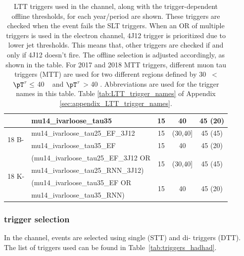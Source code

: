 \begin{table}[!htb]
\begin{tabular}{llccc}
                      & mu14\_ivarloose\_tau35 &15 & 40 & 45 (20) \\
      \midrule
      \multirow{2}{*}{18 B-}  & mu14\_ivarloose\_tau25\_EF\_3J12 & 15 & (30,40] & 45 (45) \\ \cmidrule{2-5}
                      & mu14\_ivarloose\_tau35\_EF & 15 & 40 & 45 (20) \\
      \midrule
        \multirow{4}{*}{18 K-}  & (mu14\_ivarloose\_tau25\_EF\_3J12 OR & \multirow{2}{*}{15} &  \multirow{2}{*}{(30,40]} & \multirow{2}{*}{45 (45)}\\
                     & mu14\_ivarloose\_tau25\_RNN\_3J12) & & &\\ \cmidrule{2-5}
                     & (mu14\_ivarloose\_tau35\_EF OR &\multirow{2}{*}{15} & \multirow{2}{*}{40}  & \multirow{2}{*}{45 (20)}\\
                     & mu14\_ivarloose\_tau35\_RNN) & & &\\                     
    \bottomrule
  \end{tabular}
  \caption{LTT triggers used in the \lephad channel, along with the trigger-dependent offline \pT thresholds, for each year/period are shown. 
  These triggers are checked when the event fails the SLT triggers. 
  When an OR of multiple triggers is used in the electron channel, 4J12 trigger is prioritized due to lower jet \pT thresholds. 
  This means that, other triggers are checked if and only if 4J12 doesn't fire. The offline selection is adjusted accordingly, as shown in the table.
 For 2017 and 2018 MTT triggers, different muon tau triggers (MTT) are used for two different regions defined by 30 \GeV~< $\pT^{\tau} \leq$ 40 \GeV~ and $\pT^{\tau}$ > 40 \GeV. 
  Abbreviations are used for the trigger names in this table. Table \ref{tab:LTT_trigger_names} of Appendix \ref{sec:appendix_LTT_trigger_names}.}
  \label{tab:LTTtriggers_lephad}
\end{table}

\subsubsection{\hadhad trigger selection}
\label{sec:hadhad_trigger_selection}

In the \tauhad\tauhad channel, events are selected using single (STT) and di-\tauhad
triggers (DTT). The list of triggers used can be found in Table~\ref{tab:triggers_hadhad}.

